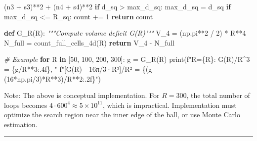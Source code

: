 \documentclass[
]{article}
\newenvironment{Shaded}{}{}
\newcommand{\BuiltInTok}[1]{\textcolor[rgb]{0.00,0.50,0.00}{#1}}
\newcommand{\CommentTok}[1]{\textcolor[rgb]{0.38,0.63,0.69}{\textit{#1}}}
\newcommand{\ControlFlowTok}[1]{\textcolor[rgb]{0.00,0.44,0.13}{\textbf{#1}}}
\newcommand{\DecValTok}[1]{\textcolor[rgb]{0.25,0.63,0.44}{#1}}
\newcommand{\KeywordTok}[1]{\textcolor[rgb]{0.00,0.44,0.13}{\textbf{#1}}}
\newcommand{\NormalTok}[1]{#1}
\newcommand{\OperatorTok}[1]{\textcolor[rgb]{0.40,0.40,0.40}{#1}}
\newcommand{\SpecialCharTok}[1]{\textcolor[rgb]{0.25,0.44,0.63}{#1}}
\newcommand{\SpecialStringTok}[1]{\textcolor[rgb]{0.73,0.40,0.53}{#1}}
\begin{document}
\begin{Shaded}
\begin{Highlighting}[]
\NormalTok{                                           (n3 }\OperatorTok{+}\NormalTok{ s3)}\OperatorTok{**}\DecValTok{2} \OperatorTok{+}\NormalTok{ (n4 }\OperatorTok{+}\NormalTok{ s4)}\OperatorTok{**}\DecValTok{2}
                                    \ControlFlowTok{if}\NormalTok{ d\_sq }\OperatorTok{\textgreater{}}\NormalTok{ max\_d\_sq:}
\NormalTok{                                        max\_d\_sq }\OperatorTok{=}\NormalTok{ d\_sq}
                    \ControlFlowTok{if}\NormalTok{ max\_d\_sq }\OperatorTok{\textless{}=}\NormalTok{ R\_sq:}
\NormalTok{                        count }\OperatorTok{+=} \DecValTok{1}
    \ControlFlowTok{return}\NormalTok{ count}

\KeywordTok{def}\NormalTok{ G\_R(R):}
    \CommentTok{"""Compute volume deficit G(R)"""}
\NormalTok{    V\_4 }\OperatorTok{=}\NormalTok{ (np.pi}\OperatorTok{**}\DecValTok{2} \OperatorTok{/} \DecValTok{2}\NormalTok{) }\OperatorTok{*}\NormalTok{ R}\OperatorTok{**}\DecValTok{4}
\NormalTok{    N\_full }\OperatorTok{=}\NormalTok{ count\_full\_cells\_4d(R)}
    \ControlFlowTok{return}\NormalTok{ V\_4 }\OperatorTok{{-}}\NormalTok{ N\_full}

\CommentTok{\# Example}
\ControlFlowTok{for}\NormalTok{ R }\KeywordTok{in}\NormalTok{ [}\DecValTok{50}\NormalTok{, }\DecValTok{100}\NormalTok{, }\DecValTok{200}\NormalTok{, }\DecValTok{300}\NormalTok{]:}
\NormalTok{    g }\OperatorTok{=}\NormalTok{ G\_R(R)}
    \BuiltInTok{print}\NormalTok{(}\SpecialStringTok{f"R=}\SpecialCharTok{\{}\NormalTok{R}\SpecialCharTok{\}}\SpecialStringTok{: G(R)/R\^{}3 = }\SpecialCharTok{\{}\NormalTok{g}\OperatorTok{/}\NormalTok{R}\OperatorTok{**}\DecValTok{3}\SpecialCharTok{:.4f\}}\SpecialStringTok{, "}
          \SpecialStringTok{f"[G(R) {-} 16π/3·R³]/R² = }\SpecialCharTok{\{}\NormalTok{(g }\OperatorTok{{-}}\NormalTok{ (}\DecValTok{16}\OperatorTok{*}\NormalTok{np.pi}\OperatorTok{/}\DecValTok{3}\NormalTok{)}\OperatorTok{*}\NormalTok{R}\OperatorTok{**}\DecValTok{3}\NormalTok{)}\OperatorTok{/}\NormalTok{R}\OperatorTok{**}\DecValTok{2}\SpecialCharTok{:.2f\}}\SpecialStringTok{"}\NormalTok{)}
\end{Highlighting}
\end{Shaded}

Note: The above is conceptual implementation. For \(R = 300\), the total
number of loops becomes \(4 \cdot 600^4 \approx 5 \times 10^{11}\),
which is impractical. Implementation must optimize the search region
near the inner edge of the ball, or use Monte Carlo estimation.

\begin{center}\rule{0.5\linewidth}{0.5pt}\end{center}
\end{document}
